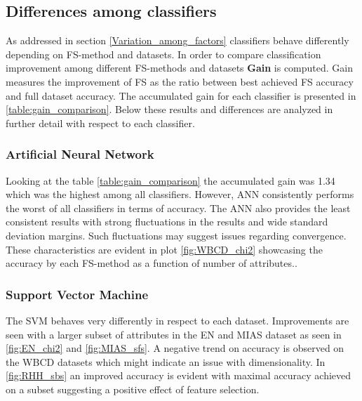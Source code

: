 \subsection{Differences among classifiers}

As addressed in section \ref{Variation_among_factors} classifiers behave differently depending on FS-method and datasets.
In order to compare classification improvement among different FS-methods and datasets \textbf{Gain} is computed. Gain measures the improvement of FS as the ratio between best achieved FS accuracy and full dataset accuracy. The accumulated gain for each classifier is presented in \ref{table:gain_comparison}. Below these results and differences are analyzed in further detail with respect to each classifier.

\begin{table}[hp]
  
  \caption[]%
  {{\small Ranking of which classifiers gained most accuracy when comparing feature selection to full dataset.}}
  \label{table:gain_comparison}
\end{table}

\subsubsection{Artificial Neural Network}

Looking at the table \ref{table:gain_comparison} the accumulated gain was 1.34 which was the highest among all classifiers. However, ANN consistently performs the worst of all classifiers in terms of accuracy. The ANN also provides the least consistent results with strong fluctuations in the results and wide standard deviation margins. Such fluctuations may suggest issues regarding convergence. These characteristics are evident in plot \ref{fig:WBCD_chi2} showcasing the accuracy by each FS-method as a function of number of attributes..

\subsubsection{Support Vector Machine}

The SVM behaves very differently in respect to each dataset. Improvements are seen with a larger subset of attributes in the EN and MIAS dataset as seen in \ref{fig:EN_chi2} and \ref{fig:MIAS_sfs}. A negative trend on accuracy is observed on the WBCD datasets which might indicate an issue with dimensionality. In \ref{fig:RHH_sbs} an improved accuracy is evident with maximal accuracy achieved on a subset suggesting a positive effect of feature selection.

